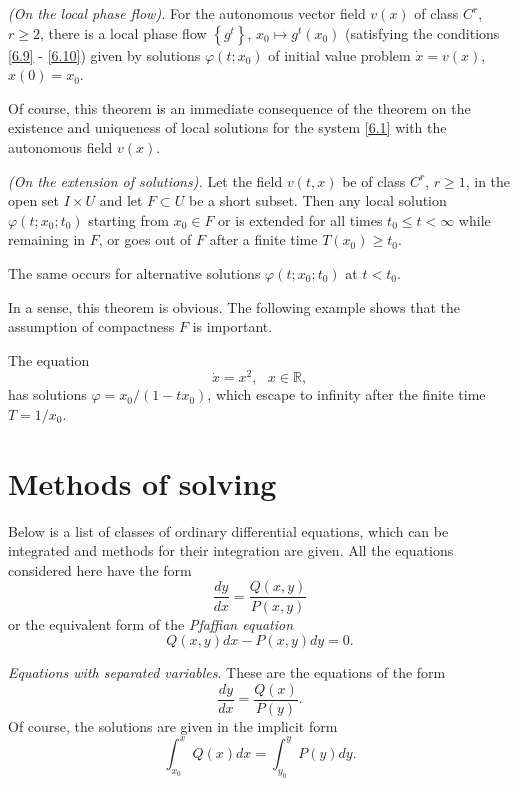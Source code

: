 \begin{theorem}\emph{(On the local phase flow).}
	For the autonomous vector field $v (x)$ of class $C^r$, $r \geq 2$, there is a local phase flow $\left\{ g^{t}\right\}$, $x_{0}\longmapsto g^{t}(x_{0})$ (satisfying the conditions \eqref{6.9} - \eqref{6.10}) given by solutions $\varphi (t;x_{0})$ of initial value problem $\dot{x}=v(x)$, $x(0)=x_{0}$.
\end{theorem}

Of course, this theorem is an immediate consequence of the theorem on the existence and uniqueness of local solutions for the system \eqref{6.1} with the autonomous field $v (x)$.

\begin{theorem}\emph{(On the extension of solutions).}
	Let the field $v (t, x)$ be of class $C^r$, $r \geq 1$, in the open set $I\times U$ and let $F\subset U$ be a short subset. Then any local solution $\varphi (t;x_{0};t_{0})$ starting from $x_{0}\in F$ or is extended for all times $t_{0}\leq t<\infty $ while remaining in $F$, or goes out of $F$ after a finite time $T(x_{0})\geq t_{0}$.
	
	The same occurs for alternative solutions $\varphi
	(t;x_{0};t_{0})$ at $t <t_0$.
\end{theorem}

In a sense, this theorem is obvious. The following example shows that the assumption of compactness $F$ is important.

\begin{example}
	The equation
	$$
	\dot{x}=x^{2},\text{ \ \ }x\in \mathbb{R},
	$$
	has solutions $\varphi =x_{0}/(1-tx_{0})$, which escape to infinity after the finite time $T=1/x_{0}.$
\end{example}

\section{Methods of solving}
Below is a list of classes of ordinary differential equations, which can be integrated and methods for their integration are given. All the equations considered here have the form
\begin{equation}
\label{6.16}
\frac{dy}{dx}=\frac{Q(x,y)}{P(x,y)}
\end{equation}
or the equivalent form of the \emph{Pfaffian equation}
$$
Q(x,y)dx-P(x,y)dy=0.
$$

\begin{example}
	\emph{Equations with separated variables}. These are the equations of the form
	$$
	\frac{dy}{dx}=\frac{Q(x)}{P(y)}.
	$$
	Of course, the solutions are given in the implicit form
	$$
	\int_{x_{0}}^{x}Q(x)dx=\int_{y_{0}}^{y}P(y)dy.
	$$
\end{example}

